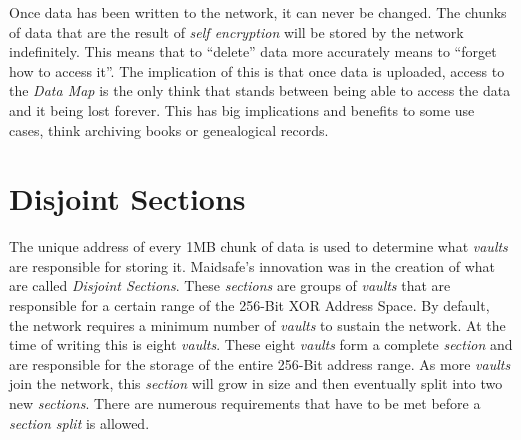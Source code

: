 Once data has been written to the network, it can never be changed. The chunks of data that are the result of \textit{self encryption} will be stored by the network indefinitely. This means that to ``delete'' data more accurately means to ``forget how to access it''. The implication of this is that once data is uploaded, access to the \textit{Data Map} is the only think that stands between being able to access the data and it being lost forever. This has big implications and benefits to some use cases, think archiving books or genealogical records.

\section{Disjoint Sections}

The unique address of every 1MB chunk of data is used to determine what \textit{vaults} are responsible for storing it. Maidsafe's innovation was in the creation of what are called \textit{Disjoint Sections}. These \textit{sections} are groups of \textit{vaults} that are responsible for a certain range of the 256-Bit XOR Address Space. By default, the network requires a minimum number of \textit{vaults} to sustain the network. At the time of writing this is eight \textit{vaults}. These eight \textit{vaults} form a complete \textit{section} and are responsible for the storage of the entire 256-Bit address range. As more \textit{vaults} join the network, this \textit{section} will grow in size and then eventually split into two new \textit{sections}. There are numerous requirements that have to be met before a \textit{section split} is allowed.


